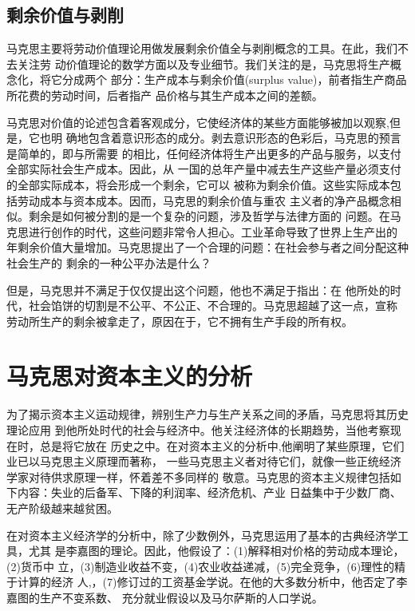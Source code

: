 \subsection{剩余价值与剥削}

马克思主要将劳动价值理论用做发展剩余价值全与剥削概念的工具。在此，我们不去关注劳
动价值理论的数学方面以及专业细节。我们关注的是，马克思将生产概念化，将它分成两个
部分：生产成本与剩余价值(surplus value)，前者指生产商品所花费的劳动时间，后者指产
品价格与其生产成本之间的差额。

马克思对价值的论述包含着客观成分，它使经济体的某些方面能够被加以观察,但是，它也明
确地包含着意识形态的成分。剥去意识形态的色彩后，马克思的预言是简单的，即与所需要
的相比，任何经济体将生产出更多的产品与服务，以支付全部实际社会生产成本。因此，从
一国的总年产量中减去生产这些产量必须支付的全部实际成本，将会形成一个剩余，它可以
被称为剩余价值。这些实际成本包括劳动成本与资本成本。因而，马克思的剩余价值与重农
主义者的净产品概念相似。剩余是如何被分割的是一个复杂的问题，涉及哲学与法律方面的
问题。在马克思进行创作的时代，这些问题非常令人担心。工业革命导致了世界上生产出的
年剩余价值大量增加。马克思提出了一个合理的问题：在社会参与者之间分配这种社会生产的
剩余的一种公平办法是什么？

但是，马克思并不满足于仅仅提出这个问题，他也不满足于指出：在
他所处的时代，社会馅饼的切割是不公平、不公正、不合理的。马克思超越了这一点，宣称
劳动所生产的剩余被拿走了，原因在于，它不拥有生产手段的所有权。

\section{马克思对资本主义的分析}

为了揭示资本主义运动规律，辨别生产力与生产关系之间的矛盾，马克思将其历史理论应用
到他所处时代的社会与经济中。他关注经济体的长期趋势，当他考察现在时，总是将它放在
历史之中。在对资本主义的分析中,他阐明了某些原理，它们业已以马克思主义原理而著称，
一些马克思主义者对待它们，就像一些正统经济学家对待供求原理一样，怀着差不多同样的
敬意。马克思的资本主义规律包括如下内容：失业的后备军、下降的利润率、经济危机、产业
日益集中于少数厂商、无产阶级越来越贫困。

在对资本主义经济学的分析中，除了少数例外，马克思运用了基本的古典经济学工具，尤其
是李嘉图的理论。因此，他假设了：(1)解释相对价格的劳动成本理论，(2)货币中
立，(3)制造业收益不变，(4)农业收益递减，(5)完全竞争，(6)理性的精于计算的经济
人,，(7)修订过的工资基金学说。在他的大多数分析中，他否定了李嘉图的生产不变系数、
充分就业假设以及马尔萨斯的人口学说。

